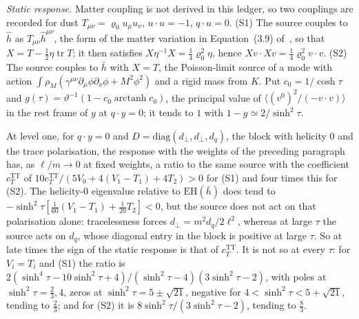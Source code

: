 \emph{Static response.} Matter coupling is not derived in this ledger, so two couplings are recorded for dust \(T_{\mu\nu}=\varrho_0u_\mu u_\nu\), \(u\cdot u=-1\), \(q\cdot u=0\). (S1) The source couples to \(\hat h\) as \(T_{\mu\nu}\hat h^{\mu\nu}\), the form of the matter variation in Equation~(3.9) of~\cite{Steinacker2026}, so that \(X=T-\tfrac12\eta\operatorname{tr}T\); it then satisfies \(X\eta^{-1}X=\tfrac14\varrho_0^2\eta\), hence \(Xv\cdot Xv=\tfrac14\varrho_0^2v\cdot v\). (S2) The source couples to \(\bar h\) with \(X=T\), the Poisson-limit source of a mode with action \(\int\rho_M(\gamma^{\mu\nu}\partial_\mu\phi\partial_\nu\phi+M^2\phi^2)\) and a rigid mass from \(K\). Put \(c_0=1/\cosh\tau\) and \(g(\tau)=\vartheta^{-1}(1-c_0\operatorname{arctanh}c_0)\), the principal value of \(\langle(v^0)^2/(-v\cdot v)\rangle\) in the rest frame of \(y\) at \(q\cdot y=0\); it tends to \(1\) with \(1-g\simeq2/\sinh^2\tau\).

At level one, for \(q\cdot y=0\) and \(D=\mathrm{diag}(d_\perp,d_\perp,d_q)\), the block with helicity \(0\) and the trace polarisation, the response with the weights of the preceding paragraph has, as \(\ell/m\to0\) at fixed weights, a ratio to the same source with the coefficient \(c_T^{\mathrm{TT}}\) of \(10c_T^{\mathrm{TT}}/(5V_0+4(V_1-T_1)+4T_2)>0\) for (S1) and four times this for (S2). The helicity-\(0\) eigenvalue relative to \(\mathrm{EH}(\bar h)\) does tend to \(-\sinh^2\tau[\tfrac1{60}(V_1-T_1)+\tfrac1{20}T_2]<0\), but the source does not act on that polarisation alone: tracelessness forces \(d_\perp=m^2d_q/2\ell^2\), whereas at large \(\tau\) the source acts on \(d_q\), whose diagonal entry in the block is positive at large \(\tau\). So at late times the sign of the static response is that of \(c_T^{\mathrm{TT}}\). It is not so at every \(\tau\): for \(V_i=T_i\) and (S1) the ratio is \(2(\sinh^4\tau-10\sinh^2\tau+4)/(\sinh^2\tau-4)(3\sinh^2\tau-2)\), with poles at \(\sinh^2\tau=\tfrac23,4\), zeros at \(\sinh^2\tau=5\pm\sqrt{21}\), negative for \(4<\sinh^2\tau<5+\sqrt{21}\), tending to \(\tfrac23\); and for (S2) it is \(8\sinh^2\tau/(3\sinh^2\tau-2)\), tending to \(\tfrac83\).

